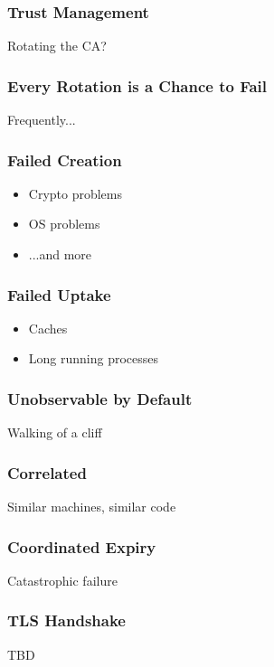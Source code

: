 \begin{frame}
\frametitle{Trust Management}

Rotating the CA?

\end{frame}

\begin{frame}
\frametitle{Every Rotation is a Chance to Fail}

Frequently...

\end{frame}


\begin{frame}
\frametitle{Failed Creation}
\begin{itemize}
\item Crypto problems
\item OS problems
\item ...and more
\end{itemize}
\end{frame}

\begin{frame}
\frametitle{Failed Uptake}
\begin{itemize}
\item Caches
\item Long running processes
\end{itemize}
\end{frame}


\begin{frame}
\frametitle{Unobservable by Default}
Walking of a cliff
\end{frame}

\begin{frame}
\frametitle{Correlated}
Similar machines, similar code
\end{frame}

\begin{frame}
\frametitle{Coordinated Expiry}

Catastrophic failure
\end{frame}

\begin{frame}
\frametitle{TLS Handshake}

TBD

\end{frame}

